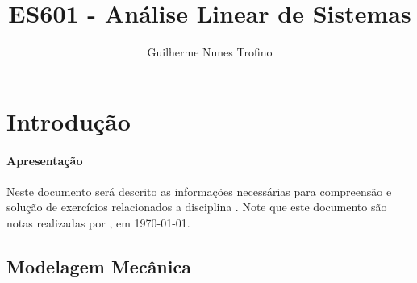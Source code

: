\documentclass{article}
\title{ES601 - Análise Linear de Sistemas}
\author{Guilherme Nunes Trofino}
\begin{document}
    \maketitle
\newpage

    \tableofcontents
\newpage

\section{Introdução}
    \paragraph{Apresentação}Neste documento será descrito as informações necessárias para compreensão e solução de exercícios relacionados a disciplina \thetitle . Note que este documento são notas realizadas por \theauthor , em \today.

\subsection{Modelagem Mecânica}
\end{document}
